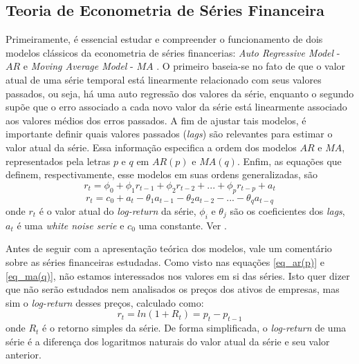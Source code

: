 \documentclass[12pt]{article}
\begin{document}
\subsection{Teoria de Econometria de Séries Financeira}\label{subsec_teoria}
Primeiramente, é essencial estudar e compreender o funcionamento de dois modelos clássicos da econometria de séries financerias: \textit{Auto Regressive Model }- $ AR $ e \textit{Moving Average Model }- $ MA $ \cite{Tsay}. O primeiro baseia-se no fato de que o valor atual de uma série temporal está linearmente relacionado com seus valores passados, ou seja, há uma auto regressão dos valores da série, enquanto o segundo supõe que o erro associado a cada novo valor da série está linearmente associado aos valores médios dos erros passados. A fim de ajustar tais modelos, é importante definir quais valores passados (\textit{lags}) são relevantes para estimar o valor atual da série. Essa informação especifica a ordem dos modelos $AR$ e $MA$, representados pela letras $p$ e $q$ em $AR(p)$ e $MA(q)$. Enfim, as equações que definem, respectivamente, esse modelos em suas ordens generalizadas, são
\begin{equation}\label{eq_ar(p)}
r_{t}=\phi_{0}+\phi_{1}r_{t-1}+\phi_{2}r_{t-2}+...+\phi_{p}r_{t-p}+a_{t}
\end{equation}
\begin{equation}\label{eq_ma(q)}
r_{t}=c_{0}+a_{t}-\theta_{1}a_{t-1}-\theta_{2}a_{t-2}-...-\theta_{q}a_{t-q}
\end{equation}
onde $r_{t}$ é o valor atual do \textit{log-return} da série, $\phi_{i}$ e $\theta_{j}$ são os coeficientes dos \textit{lags}, $a_{t}$ é uma \textit{white noise serie} e $c_{0}$ uma constante. Ver \cite{Tsay}.

Antes de seguir com a apresentação teórica dos modelos, vale um comentário sobre as séries financeiras estudadas. Como visto nas equações \ref{eq_ar(p)} e \ref{eq_ma(q)}, não estamos interessados nos valores em si das séries. Isto quer dizer que não serão estudados nem analisados os preços dos ativos de empresas, mas sim o \textit{log-return} desses preços, calculado como:
\begin{equation}\label{eq_logret}
r_{t}=ln(1+R_{t})=p_{t}-p_{t-1}
\end{equation}
onde $R_{t}$ é o retorno simples da série. De forma simplificada, o \textit{log-return} de uma série é a diferença dos logaritmos naturais do valor atual da série e seu valor anterior.
\end{document}

